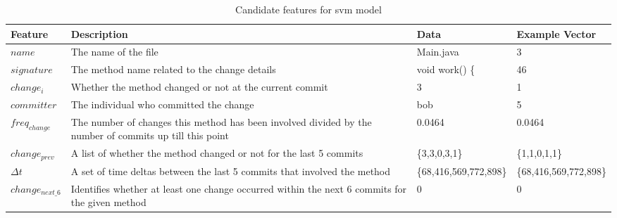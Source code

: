 \begin{table}
\begin{center}
    \begin{tabularx}{\linewidth}{|l|X|l|l|}
        \hline
        Feature & Description & Data & Example Vector \\
        \hline
        $name$ & The name of the file & Main.java & 3 \\ \hline
        $signature$ & The method name related to the change details & void work() \{ & 46\\ \hline
        $change_i$ & Whether the method changed or not at the current commit & 3 & 1 \\ \hline
        $committer$ & The individual who committed the change & bob & 5 \\ \hline
        $freq_{change}$ & The number of changes this method has been involved divided by the number of commits up till this point & 0.0464 & 0.0464 \\ \hline
        $change_{prev}$ & A list of whether the method changed or not for the last 5 commits & \{3,3,0,3,1\} & \{1,1,0,1,1\} \\ \hline
        $\Delta t$ & A set of time deltas between the last 5 commits that involved the method & \{68,416,569,772,898\} & \{68,416,569,772,898\} \\
        \hline
        $change_{next\_6}$ & Identifies whether at least one change occurred within the next 6 commits for the given method & 0 & 0\\
        \hline
    \end{tabularx}
\end{center}
    \caption{Candidate features for \gls{svm} model}
    \label{tab:candidate_features}
\end{table}


